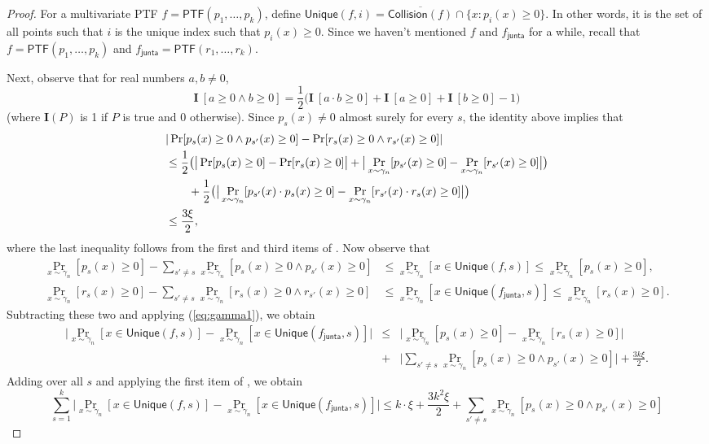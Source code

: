 \documentclass{toc}
\newcommand{\fh}{{f_{\mathsf{junta}}}}
\begin{document}
\begin{proof}
For
a multivariate PTF $f = \mathsf{PTF}(p_1, \ldots, p_k)$, define
$\mathsf{Unique}(f,i) = \overline{\mathsf{Collision}(f)} \cap \{x : p_i(x)  \ge
0\}$. In other words, it is the set of all points such that $i$ is the unique
index such that $p_i(x) \ge 0$.
Since we haven't mentioned $f$ and $\fh$ for a while, recall that $f =
\mathsf{PTF}(p_1, \dots, p_k)$ and $\fh = \mathsf{PTF}(r_1, \dots, r_k)$.

Next, observe that for real numbers $a, b \ne 0$,
\begin{equation}
  \label{eq:identity}
  \mathbf{I} \ [a \ge 0 \wedge b \ge 0] = \frac12 \big( \mathbf{I} \ [ a \cdot b \ge 0] + \mathbf{I} \ [a \ge 0] + \mathbf{I} \ [b \ge 0] - 1\big)
\end{equation}
(where $\mathbf{I}(P)$ is 1 if $P$ is true and $0$ otherwise).
Since $p_s(x) \ne 0$ almost surely for every $s$, the identity above implies that
\begin{align}
&| \Pr [p_{s}(x) \ge 0 \wedge p_{s'}(x) \ge 0]  - \Pr [r_{s}(x) \ge 0 \wedge r_{s'}(x) \ge 0] | \notag \\
& \le \frac{1}{2} \big( \big| \Pr[p_{s}(x) \ge 0 ]  - \Pr [r_{s}(x) \ge 0 ] \big| +  \big| \Pr_{x \sim \gamma_n} [p_{s'}(x) \ge 0 ]  - \Pr_{x \sim \gamma_n} [r_{s'}(x) \ge 0 ] \big|\big) \notag \\
& \qquad +\frac{1}{2}  \big( \big| \Pr_{x \sim \gamma_n} [p_{s'}(x) \cdot p_s(x) \ge 0 ]  - \Pr_{x \sim \gamma_n} [r_{s'}(x)  \cdot r_s(x)\ge 0 ] \big|\big) \notag \\
&\le \frac{3\xi}{2},
\label{eq:gamma1}
\end{align}
where the last inequality follows from the first and third items of . Now observe that 
\begin{align*}
\Pr_{x \sim \gamma_n} [p_s(x) \ge 0] - \sum_{s' \neq s} \Pr_{x \sim \gamma_n} [p_s(x) \ge 0 \wedge p_{s'}(x) \ge 0]  &\leq \Pr_{x \sim \gamma_n} [x \in \mathsf{Unique}(f,s)] \le \Pr_{x \sim \gamma_n} [p_s(x) \ge 0],\\
\Pr_{x \sim \gamma_n} [r_s(x) \ge 0] - \sum_{s' \neq s} \Pr_{x \sim \gamma_n} [r_s(x) \ge 0 \wedge r_{s'}(x) \ge 0]  &\leq \Pr_{x \sim \gamma_n} [x \in \mathsf{Unique}(\fh,s)] \le \Pr_{x \sim \gamma_n} [r_s(x) \ge 0].
\end{align*}
Subtracting these two and applying (\ref{eq:gamma1}), we obtain
\begin{eqnarray*}
\big|\Pr_{x \sim \gamma_n} [x \in \mathsf{Unique}(f,s)]- \Pr_{x \sim \gamma_n} [x \in \mathsf{Unique}(\fh,s)] \big| &\leq& \big| \Pr_{x \sim \gamma_n} [p_s(x) \ge 0] -\Pr_{x \sim \gamma_n} [r_s(x) \ge 0]\big| \\ &+& \big|\sum_{s' \neq s} \Pr_{x \sim \gamma_n} [p_s(x) \ge 0 \wedge p_{s'}(x) \ge 0]\big| + \frac{3k \xi}{2}.
\end{eqnarray*}
Adding over all $s$ and applying the first item of ,  we obtain 
\[
\sum_{s=1}^k \big|\Pr_{x \sim \gamma_n} [x \in \mathsf{Unique}(f,s)]- \Pr_{x \sim \gamma_n} [x \in \mathsf{Unique}(\fh,s)] \big| \le k\cdot \xi + \frac{3k^2 \xi}{2} +\sum_{s' \neq s} \Pr_{x \sim \gamma_n} [p_s(x) \ge 0 \wedge p_{s'}(x) \ge 0]
\]


\end{proof}
\end{document}
